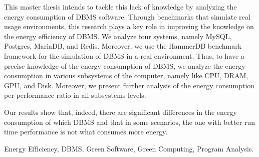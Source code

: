 This master thesis intends to tackle this lack of knowledge by analyzing the energy consumption of DBMS software. Through benchmarks that simulate real usage environments, this research plays a key role in improving the knowledge on the energy efficiency of DBMS. We analyze four systems, namely MySQL, Postgres, MariaDB, and Redis. Moreover, we use the HammerDB benchmark framework for the simulation of DBMS in a real environment. Thus, to have a precise knowledge of the energy consumption of DBMS, we analyze the energy consumption in various subsystems of the computer, namely like CPU, DRAM, GPU, and Disk. Moreover, we present further analysis of the energy consumption per performance ratio in all subsystems levels. 


Our results show that, indeed, there are significant differences in the energy consumption of which DBMS and that in some scenarios, the one with better run time performance is not what consumes more energy.





    
    
    
    


\begin{keywords}
Energy Efficiency, DBMS, Green Software, Green Computing, Program Analysis.
\end{keywords} 
